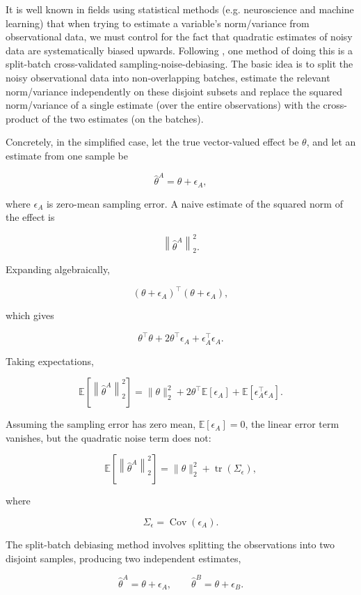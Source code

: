 \documentclass{article}
\begin{document}
It is well known in fields using statistical methods (e.g. neuroscience and machine learning) that when trying to estimate a variable's norm/variance from observational data, we must control for the fact that quadratic estimates of noisy data are systematically biased upwards. Following \citep{WaltherEtAl2016,WuEtAl2026}, one method of doing this is a split-batch cross-validated sampling-noise-debiasing. The basic idea is to split the noisy observational data into non-overlapping batches, estimate the relevant norm/variance independently on these disjoint subsets and replace the squared norm/variance of a single estimate (over the entire observations) with the cross-product of the two estimates (on the batches).

Concretely, in the simplified case, let the true vector-valued effect be
$\theta$, and let an estimate from one sample be

\[
\hat{\theta}^{A} = \theta + \epsilon_A,
\]

where $\epsilon_A$ is zero-mean sampling error. A naive estimate of the
squared norm of the effect is

\[
\left\|\hat{\theta}^{A}\right\|_2^2.
\]

Expanding algebraically,

\[
\left(\theta + \epsilon_A\right)^\top
\left(\theta + \epsilon_A\right),
\]

which gives

\[
\theta^\top\theta
+ 2\theta^\top\epsilon_A
+ \epsilon_A^\top\epsilon_A.
\]

Taking expectations,

\[
\mathbb{E}\left[
\left\|\hat{\theta}^{A}\right\|_2^2
\right]
=
\|\theta\|_2^2
+ 2\theta^\top\mathbb{E}[\epsilon_A]
+ \mathbb{E}\left[\epsilon_A^\top\epsilon_A\right].
\]

Assuming the sampling error has zero mean,
$\mathbb{E}[\epsilon_A]=0$, the linear error term vanishes, but the
quadratic noise term does not:

\[
\mathbb{E}\left[
\left\|\hat{\theta}^{A}\right\|_2^2
\right]
=
\|\theta\|_2^2
+
\operatorname{tr}\left(\Sigma_{\epsilon}\right),
\]

where

\[
\Sigma_{\epsilon}
=
\operatorname{Cov}(\epsilon_A).
\]

The split-batch debiasing method involves splitting the observations into two disjoint samples, producing two independent estimates,

\[
\hat{\theta}^{A} = \theta + \epsilon_A,
\qquad
\hat{\theta}^{B} = \theta + \epsilon_B.
\]
\end{document}
